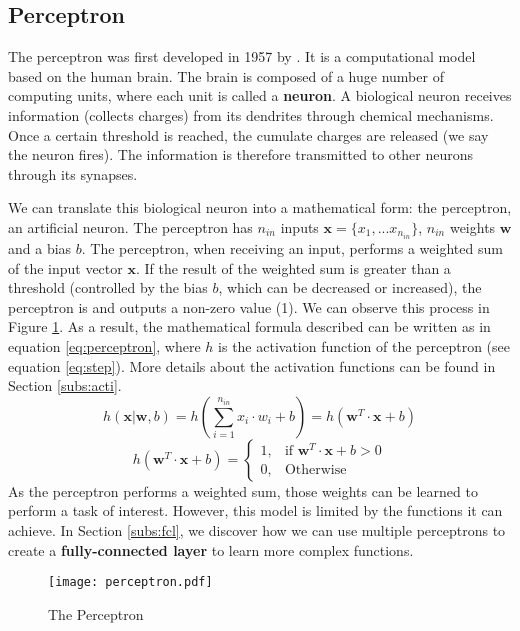 \subsection{Perceptron} \label{subs:perceptron}
The perceptron was first developed in 1957 by \textcite{brain_perceptron_nodate}. It is a computational model based on the human brain. The brain is composed of a huge number of computing units, where each unit is called a \textbf{neuron}. A biological neuron receives information (collects charges) from its dendrites through chemical mechanisms. Once a certain threshold is reached, the cumulate charges are released (we say the neuron fires). The information is therefore transmitted to other neurons through its synapses.

We can translate this biological neuron into a mathematical form: the perceptron, an artificial neuron. The perceptron has $n_{in}$ inputs $\boldsymbol{x} = \{ x_1, ... x_{n_{in}} \}$, $n_{in}$ weights $\boldsymbol{w}$ and a bias $b$. The perceptron, when receiving an input, performs a weighted sum of the input vector $\boldsymbol{x}$. If the result of the weighted sum is greater than a threshold (controlled by the bias $b$, which can be decreased or increased), the perceptron is  and outputs a non-zero value (1). We can observe this process in Figure \ref{fig:perceptron}. As a result, the mathematical formula described can be written as in equation \eqref{eq:perceptron}, where $h$ is the activation function of the perceptron (see equation \eqref{eq:step}). More details about the activation functions can be found in Section \ref{subs:acti}.
%
\begin{equation}
    h ( \boldsymbol{x} | \boldsymbol{w}, b) = h \left( \sum^{n_{in}}_{i=1} x_i \cdot w_i + b \right) = h \left( \boldsymbol{w}^{T} \cdot \boldsymbol{x} + b \right)
    \label{eq:perceptron}
\end{equation}
%
\begin{equation}
    h ( \boldsymbol{w}^{T} \cdot \boldsymbol{x} + b) = \begin{cases} 1, & \mbox{if } \boldsymbol{w}^{T} \cdot \boldsymbol{x} + b > 0 \\ 0, & \mbox{Otherwise} \end{cases}
    \label{eq:step}
\end{equation}
%
As the perceptron performs a weighted sum, those weights can be learned to perform a task of interest. However, this model is limited by the functions it can achieve. In Section \ref{subs:fcl}, we discover how we can use multiple perceptrons to create a \textbf{fully-connected layer} to learn more complex functions.
%
\begin{figure}
    \centering
    \texttt{[image: perceptron.pdf]}
    \caption{The Perceptron}
    \label{fig:perceptron}
\end{figure}
